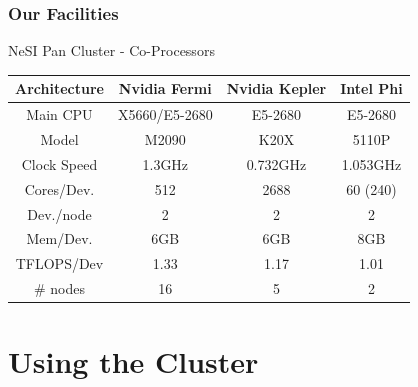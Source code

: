 \documentclass{beamer}
\begin{document}
{
  \frametitle{Our Facilities}
      \begin{block}{NeSI Pan Cluster - Co-Processors}
      \begin{center}
       \begin{small}
      \begin{tabular}{|c|c|c|c|}
      \hline 
      \textbf{Architecture} & \textbf{Nvidia Fermi} & \textbf{Nvidia Kepler} & \textbf{Intel Phi} \\ 
      \hline 
      Main CPU                  &  X5660/E5-2680       &  E5-2680                   &  E5-2680 \\
      \hline 
      Model                       &  M2090                     &   K20X                       &  5110P \\ 
      \hline 
      Clock Speed             &  1.3GHz                    &  0.732GHz                      &  1.053GHz\\ 
      \hline 
      Cores/Dev.             & 512                            & 2688                           & 60 (240) \\ 
      \hline       
      Dev./node              &  2                             &   2                                &  2  \\ 
      \hline 
      Mem/Dev.             & 6GB                          & 6GB                               & 8GB  \\ 
      \hline 
      TFLOPS/Dev         & 1.33                          & 1.17                              & 1.01 \\ 
      \hline 
      \# nodes               & 16                             & 5                                 & 2 \\ 
      \hline 
      \end{tabular} 
      \end{small}
      \end{center}
  \end{block}
}

\section{Using the Cluster}      
\end{document}
